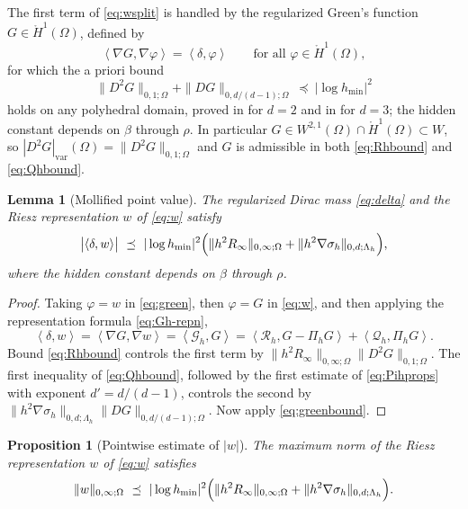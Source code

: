 \documentclass[12pt]{amsart}
\newtheorem{proposition}{Proposition}
\newtheorem{lemma}{Lemma}
\theoremstyle{definition}
\newcommand{\Om}{\Omega}
\newcommand{\Pih}{\Pi_h}
\newcommand{\Gh}{\mathcal{G}_h}
\newcommand{\Rh}{\mathcal{R}_h}
\newcommand{\Qh}{\mathcal{Q}_h}
\newcommand{\Lamh}{\Lambda_h}
\begin{document}
The first term of \eqref{eq:wsplit} is handled by the regularized Green's function $G \in \mathring H^1(\Om)$, defined by
\begin{equation}
\label{eq:green}
  \left<\nabla G,\nabla\varphi\right> = \left<\delta,\varphi\right> \qquad \text{for all } \varphi\in\mathring H^1(\Om),
\end{equation}
for which the a priori bound
\begin{equation}
\label{eq:greenbound}
  \|D^2 G\|_{0,1;\Om} + \|DG\|_{0,d/(d-1);\Om} \ \preceq\ |\log h_{\min}|^2
\end{equation}
holds on any polyhedral domain, proved in \cite{Nochetto1995} for $d=2$ and in \cite{Darietal2000} for $d=3$; the hidden constant depends on $\beta$ through $\rho$.  In particular $G \in W^{2,1}(\Om)\cap\mathring H^1(\Om) \subset W$, so $|D^2G|_{\mathrm{var}}(\Om) = \|D^2G\|_{0,1;\Om}$ and $G$ is admissible in both \eqref{eq:Rhbound} and \eqref{eq:Qhbound}.

\begin{lemma}[Mollified point value]
\label{lem:mollified}
The regularized Dirac mass \eqref{eq:delta} and the Riesz representation $w$ of \eqref{eq:w} satisfy
\begin{equation}
\label{eq:mollified}
  \bigl|\left<\delta,w\right>\bigr| \ \preceq\ |\log h_{\min}|^2 \Bigl(\|h^2R_\infty\|_{0,\infty;\Om} + \|h^2\nabla\sigma_h\|_{0,d;\Lamh}\Bigr),
\end{equation}
where the hidden constant depends on $\beta$ through $\rho$.
\end{lemma}

\begin{proof}
Taking $\varphi = w$ in \eqref{eq:green}, then $\varphi = G$ in \eqref{eq:w}, and then applying the representation formula \eqref{eq:Gh-repn},
\[
  \left<\delta,w\right> = \left<\nabla G,\nabla w\right> = \left<\Gh,G\right> = \left<\Rh,G-\Pih G\right> + \left<\Qh,\Pih G\right>.
\]
Bound \eqref{eq:Rhbound} controls the first term by $\|h^2R_\infty\|_{0,\infty;\Om}\|D^2G\|_{0,1;\Om}$.  The first inequality of \eqref{eq:Qhbound}, followed by the first estimate of \eqref{eq:Pihprops} with exponent $d' = d/(d-1)$, controls the second by $\|h^2\nabla\sigma_h\|_{0,d;\Lamh}\|DG\|_{0,d/(d-1);\Om}$.  Now apply \eqref{eq:greenbound}.
\end{proof}

\begin{proposition}[Pointwise estimate of $|w|$]
\label{prop:wbound}
The maximum norm of the Riesz representation $w$ of \eqref{eq:w} satisfies
\begin{equation}
\label{eq:wbound}
  \|w\|_{0,\infty;\Om} \ \preceq\ |\log h_{\min}|^2\Bigl(\|h^2R_\infty\|_{0,\infty;\Om} + \|h^2\nabla\sigma_h\|_{0,d;\Lamh}\Bigr).
\end{equation}
\end{proposition}
\end{document}
